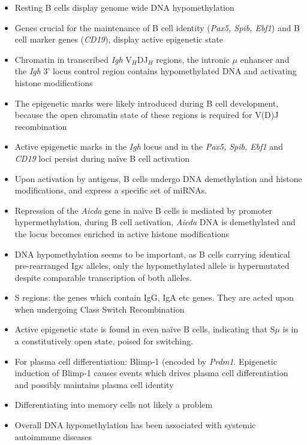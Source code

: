 \documentclass[12pt]{article}
\newcommand{\naive}{na\"{i}ve }
\begin{document}
				\begin{itemize}
					\item Resting B cells display genome wide DNA hypomethylation
					\item Genes crucial for the maintenance of B cell identity (\textit{Pax5, Spib, Ebf1}) and B cell marker genes (\textit{CD19}), display active epigenetic state
					\item Chromatin in transcribed \textit{Igh} V$_H$DJ$_H$ regions, the intronic $\mu$ enhancer and the \textit{Igh} 3' locus control region contains hypomethylated DNA and activating histone modifications
					\item The epigenetic marks were likely introduced during B cell development, because the open chromatin state of these regions is required for V(D)J recombination
					\item Active epigenetic marks in the \textit{Igh} locus and in the \textit{Pax5, Spib, Ebf1} and \textit{CD19} loci persist during na\"{i}ve B cell activation
					\item Upon activation by antigens, B cells undergo DNA demethylation and histone modifications, and express a specific set of miRNAs.
					\item Repression of the \textit{Aicda} gene in \naive B cells is mediated by promoter hypermethylation, during B cell activation, \textit{Aicda} DNA is demethylated and the locus becomes enriched in active histone modifications
					\item DNA hypomethylation seems to be important, as B cells carrying identical pre-rearranged Ig$\kappa$ alleles, only the hypomethylated allele is hypermutated despite comparable transcription of both alleles.
					\item S regions: the genes which contain IgG, IgA etc genes. They are acted upon when undergoing Class Switch Recombination
					\item Active epigenetic state is found in even \naive B cells, indicating that S$\mu$ is in a constitutively open state, poised for switching.
					\item For plasma cell differentiation: Blimp-1 (encoded by \textit{Prdm1}. Epigenetic induction of Blimp-1 causes events which drives plasma cell differentiation and possibly maintains plasma cell identity
					\item Differentiating into memory cells not likely a problem
					\item Overall DNA hypomethylation has been associated with systemic autoimmune diseases
				\end{itemize}
			
\end{document}
